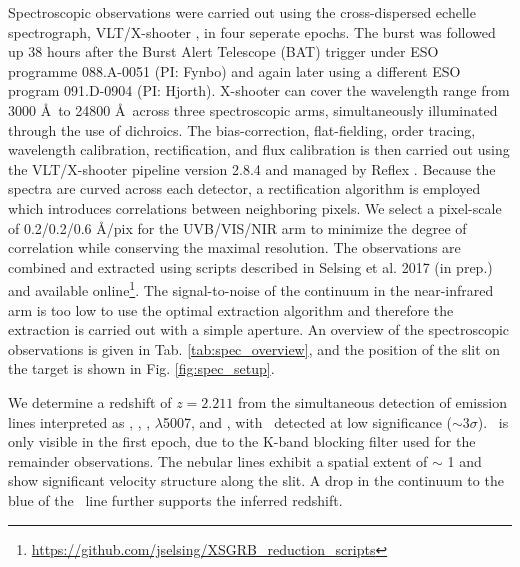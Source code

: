 \documentclass{aa}    %
\begin{document}
Spectroscopic observations were carried out using the cross-dispersed echelle spectrograph, VLT/X-shooter \citep{Vernet2011}, in four seperate epochs. The burst was followed up 38 hours after the Burst Alert Telescope (BAT) trigger under ESO programme 088.A-0051 (PI: Fynbo) and again later using a different ESO program 091.D-0904 (PI: Hjorth). X-shooter can cover the wavelength range from 3000 \AA~to 24800 \AA~across three spectroscopic arms, simultaneously illuminated through the use of dichroics. The bias-correction, flat-fielding, order tracing, wavelength calibration, rectification, and flux calibration is then carried out using the VLT/X-shooter pipeline version 2.8.4 \citep{Goldoni2006, Modigliani2010} and managed by Reflex \citep{Freudling2013}. Because the spectra are curved across each detector, a rectification algorithm is employed which introduces correlations between neighboring pixels. We select a pixel-scale of 0.2/0.2/0.6 \AA/pix for the UVB/VIS/NIR arm to minimize the degree of correlation while conserving the maximal resolution. The observations are combined and extracted using scripts described in Selsing et al. 2017 (in prep.) and available online\footnote{\url{https://github.com/jselsing/XSGRB_reduction_scripts}}. The signal-to-noise of the continuum in the near-infrared arm is too low to use the optimal extraction algorithm \citep{Horne1986} and therefore the extraction is carried out with a simple aperture.
An overview of the spectroscopic observations is given in Tab. \ref{tab:spec_overview}, and the position of the slit on the target is shown in Fig. \ref{fig:spec_setup}.


We determine a redshift of $z = 2.211$ from the simultaneous detection of emission lines interpreted as \lya, \oii, \hb, \oiii$\lambda$5007, and \ha, with \hb~detected at low significance ($\sim 3 \sigma$). \ha~is only visible in the first epoch, due to the K-band blocking filter used for the remainder observations. The nebular lines exhibit a spatial extent of $\sim$ 1 and show significant velocity structure along the slit. A drop in the continuum to the blue of the \lya~line further supports the inferred redshift.
\end{document}
